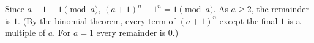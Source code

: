 Since $a+1\equiv1\pmod a$, $(a+1)^n\equiv1^n=1\pmod a$. As $a\ge2$, the remainder is $\boxed{1}$. (By the binomial theorem, every term of $(a+1)^n$ except the final $1$ is a multiple of $a$. For $a=1$ every remainder is $0$.)
